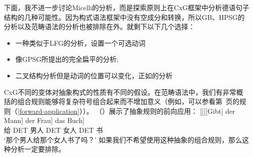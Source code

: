 下面，我不进一步讨论Micelli的分析，而是探索原则上在CxG框架中分析德语句子结构的几种可能性。因为构式语法框架中没有空成分和转换，所以GB、HPSG的分析以及范畴语法的分析也被排除在外。就剩下以下几个选择：
\begin{itemize}
\item 一种类似于LFG的分析，设置一个可选动词
\item 像GPSG所提出的完全扁平的分析;
\item 二叉结构分析但是动词的位置可以变化，正如\citet[]{Steedman2000a-u}的分析
\end{itemize}
%
CxG不同的变体对抽象构式的性质有不同的假设。在范畴语法中，我们有非常概括的组合规则能够将复杂符号组合起来而不增加意义（例如，可以参看第~\pageref{forward-application}页的规则（\ref{forward-application}））。 （）展示了抽象规则的前向应用：
\ea
\gll {}[[[[Gibt] der Mann] der Frau] das Buch]\\
	 {}\spacebr{}\spacebr{}\spacebr{}\spacebr{}给 DET 男人 DET 女人 DET 书\\
\glt `那个男人给那个女人书了吗？'
\z
如果我们不希望使用这种抽象的组合规则，那么这种分析一定要排除。

